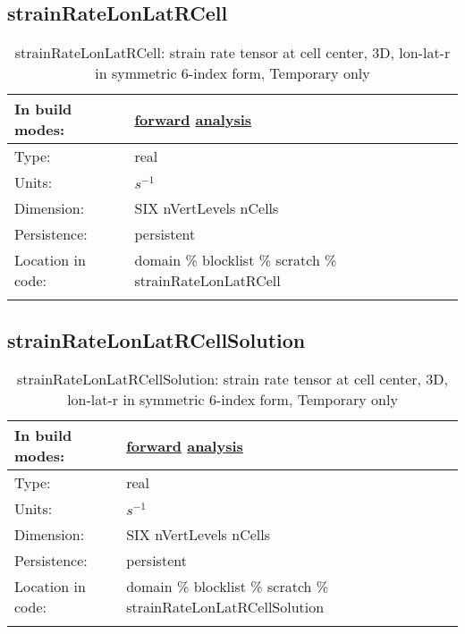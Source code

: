 \subsection[strainRateLonLatRCell]{strainRateLonLatRCell}
\label{subsec:var_sec_scratch_strainRateLonLatRCell}
\begin{center}
\begin{longtable}{| p{2.0in} | p{4.0in} |}
        \hline 
        In build modes: & \hyperref[subsec:forward_var_tab_scratch]{forward} \hyperref[subsec:analysis_var_tab_scratch]{analysis} \\
        \hline 
        Type: & real \\
        \hline 
        Units: & $s^{-1}$ \\
        \hline 
        Dimension: & SIX nVertLevels nCells \\
        \hline 
        Persistence: & persistent \\
        \hline 
		 Location in code: & domain \% blocklist \% scratch \% strainRateLonLatRCell \\
		 \hline 
    \caption{strainRateLonLatRCell: strain rate tensor at cell center, 3D, lon-lat-r in symmetric 6-index form, {\color{red}Temporary only}}
\end{longtable}
\end{center}
\subsection[strainRateLonLatRCellSolution]{strainRateLonLatRCellSolution}
\label{subsec:var_sec_scratch_strainRateLonLatRCellSolution}
\begin{center}
\begin{longtable}{| p{2.0in} | p{4.0in} |}
        \hline 
        In build modes: & \hyperref[subsec:forward_var_tab_scratch]{forward} \hyperref[subsec:analysis_var_tab_scratch]{analysis} \\
        \hline 
        Type: & real \\
        \hline 
        Units: & $s^{-1}$ \\
        \hline 
        Dimension: & SIX nVertLevels nCells \\
        \hline 
        Persistence: & persistent \\
        \hline 
		 Location in code: & domain \% blocklist \% scratch \% strainRateLonLatRCellSolution \\
		 \hline 
    \caption{strainRateLonLatRCellSolution: strain rate tensor at cell center, 3D, lon-lat-r in symmetric 6-index form, {\color{red}Temporary only}}
\end{longtable}
\end{center}
